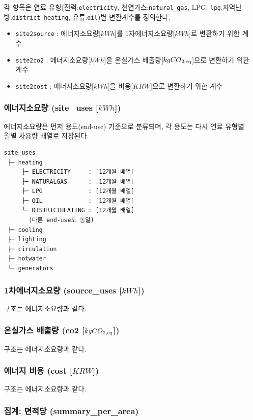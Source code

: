 각 항목은 연료 유형(전력:\texttt{electricity}, 천연가스:\texttt{natural\_gas}, LPG: \texttt{lpg},지역난방:\texttt{district\_heating}, 유류:\texttt{oil})별 변환계수를 정의한다.

\begin{itemize}
\item \texttt{site2source} : 에너지소요량[$kWh$]를 1차에너지소요량[$kWh$]로 변환하기 위한 계수
\item \texttt{site2co2} : 에너지소요량[$kWh$]을 온실가스 배출량[$kgCO\textsubscript{2,eq}$]으로 변환하기 위한 계수
\item \texttt{site2cost} : 에너지소요량[$kWh$]을 비용[$KRW$]으로 변환하기 위한 계수
\end{itemize}

\subsubsection{에너지소요량 (site\_uses [$kWh$])}

에너지소요량은 먼저 용도(end-use) 기준으로 분류되며, 각 용도는 다시 연료 유형별 월별 사용량 배열로 저장된다.

\begin{verbatim}
site_uses
 ├─ heating
     ├─ ELECTRICITY     : [12개월 배열]
     ├─ NATURALGAS      : [12개월 배열]
     ├─ LPG             : [12개월 배열]
     ├─ OIL             : [12개월 배열]
     └─ DISTRICTHEATING : [12개월 배열]
       (다른 end-use도 동일)
 ├─ cooling
 ├─ lighting
 ├─ circulation
 ├─ hotwater
 └─ generators
\end{verbatim}

\subsubsection{1차에너지소요량 (source\_uses [$kWh$])}
구조는 에너지소요량과 같다.

\subsubsection{온실가스 배출량 (co2 [$kgCO\textsubscript{2,eq}$])}
구조는 에너지소요량과 같다.

\subsubsection{에너지 비용 (cost [$KRW$])}
구조는 에너지소요량과 같다.

\subsubsection{집계: 면적당 (summary\_per\_area)}

